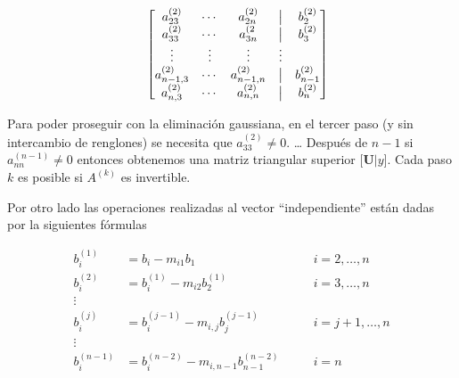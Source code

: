 \documentclass[
]{article}
\begin{document}
\begin{equation}
\begin{array}{cc}
 &  \begin{bmatrix} 
       a^{(2)}_{23}     & \cdots & a^{(2)}_{2n}   & \bigm|  &b_2^{(2)}\\
       a^{(2)}_{33}     & \cdots & a^{(2}_{3n}   & \bigm|  &b_3^{(2)}\\
     \vdots             & \vdots & \vdots         & \vdots  &\\
     a^{(2)}_{n-1,3}    & \cdots & a^{(2)}_{n-1,n}& \bigm| & b_{n-1}^{(2)}\\
     a^{(2)}_{n,3}      & \cdots & a^{(2)}_{n,n}  & \bigm|  &b_{n}^{(2)}\\
  \end{bmatrix}
\end{array}
\end{equation}

Para poder proseguir con la eliminación gaussiana, en el tercer paso (y
sin intercambio de renglones) se necesita que \(a^{(2)}_{33} \ne 0\).
\ldots{} Después de \(n-1\) si \(a_{nn}^{(n-1)}\ne 0\) entonces
obtenemos una matriz triangular superior \(\big[\mathbf{U}|y\big]\).
Cada paso \(k\) es posible si \(A^{(k)}\) es invertible.

Por otro lado las operaciones realizadas al vector ``independiente''
están dadas por la siguientes fórmulas

\begin{equation}\label{bs}
\begin{array}{ccccc}
b^{(1)}_{i}  & = b_{i}  - m_{i1}b_{1}             & & \,\,               & i=2,\ldots,n \\
b^{(2)}_{i}  & = b^{(1)}_{i}  - m_{i2}b^{(1)}_{2} & & \,\,               & i=3,\ldots,n \\
\vdots       &                                    & &                   & \\
b^{(j)}_{i}  & = b^{(j-1)}_{i}  - m_{i,j}b^{(j-1)}_{j} & & \,\,          & i=j+1,\ldots,n \\
\vdots       &                                    & &                   & \\
b^{(n-1)}_{i}  & = b^{(n-2)}_{i}  - m_{i,n-1}b^{(n-2)}_{n-1} & & \,\,   & i= n \\
\end{array}
\end{equation}
\end{document}
